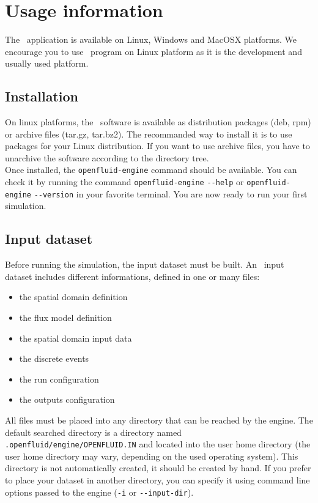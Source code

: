 \chapter{Usage information}

The \OFEname \ application is available on Linux, Windows and MacOSX platforms.
We encourage you to use \OFEname \ program on Linux platform as it is the
development and usually used platform.

\section{Installation}

On linux platforms, the \OFEname \ software is available as distribution
packages (deb, rpm) or archive files (tar.gz, tar.bz2). The recommanded way to
install it is to use packages for your Linux distribution. If you want to use
archive files, you have to unarchive the software according to the directory tree.\\
Once installed, the \texttt{openfluid-engine} command should be available.
You can check it by running the command \texttt{openfluid-engine}
\verb?--?\texttt{help} or \texttt{openfluid-engine} \verb?--?\texttt{version}
in your favorite terminal. You are now ready to run your first simulation.

\section{Input dataset}

Before running the simulation, the input dataset must be built.
An \OFEname \ input dataset includes different informations, defined in one or
many files:
\begin{itemize}
  \item the spatial domain definition
  \item the flux model definition
  \item the spatial domain input data 
  \item the discrete events
  \item the run configuration
  \item the outputs configuration
\end{itemize}

\noindent All files must be placed into any directory that can be reached by the
engine. The default searched directory is a directory named
\texttt{.openfluid/engine/OPENFLUID.IN} and located into the user home
directory (the user home directory may vary, depending on the used operating
system). This directory is not automatically created, it should be created by hand.
If you prefer to place your dataset in another directory, you can
specify it using command line options passed to the engine (\texttt{-i} or \verb?--?\texttt{input-dir}).\\

